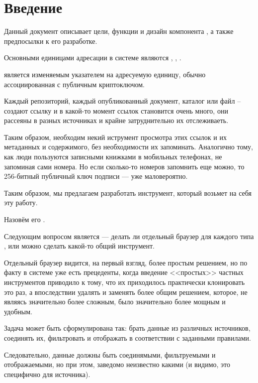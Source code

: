 
\chapter{Введение}

Данный документ описывает цели, функции и дизайн компонента
, а также предпосылки к его разработке.

Основными единицами адресации в системе являются ,
, .

 является изменяемым указателем на адресуемую единицу, обычно
ассоциированная с публичным криптоключом.

Каждый репозиторий, каждый опубликованный документ, каталог или файл -- создают
ссылку и в какой-то момент ссылок становится очень много, они рассеяны в разных
источниках и крайне затруднительно их отслеживаеть.

Таким образом, необходим некий иструмент просмотра этих ссылок и их метаданных и
содержимого, без необходимости их запоминать. Аналогично тому,  как люди
пользуются записными книжками в мобильных телефонах, не запоминая сами номера.
Но если сколько-то номеров запомнить еще можно, то 256-битный публичный ключ
подписи --- уже маловероятно.

Таким образом, мы предлагаем разработать инструмент, который возьмет на себя эту
работу.

Назовём его .

Следующим вопросом является --- делать ли отдельный браузер для каждого типа
, или можно сделать какой-то общий инструмент.

Отдельный браузер видится, на первый взгляд, более простым решением, но по факту
в системе уже есть прецеденты, когда введение <<простых>> частных инструментов
приводило к тому, что их приходилось практически клонировать это раз, а
впоследствии удалять и заменять более общим решением, которое, не являясь
значительно более сложным, было значительно более мощным и удобным.

Задача  может быть сформулирована так: брать
данные из различных источников, соединять их, фильтровать и отображать в
соответствии с заданными правилами.

Следовательно, данные должны быть соединямыми, фильтруемыми и отображаемыми, но
при этом, заведомо неизвестно какими (и видимо, это специфично для источника).

